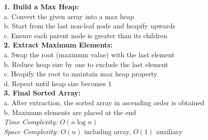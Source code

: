 {\begin{minipage}[t]{1\linewidth}
\begin{minipage}[t]{0.67\textwidth}
          \textbf{1. Build a Max Heap:}\\
          a. Convert the given array into a max heap\\
          b. Start from the last non-leaf node and heapify upwards\\
          c. Ensure each parent node is greater than its children\\
          \textbf{2. Extract Maximum Elements:}\\
          a. Swap the root (maximum value) with the last element\\
          b. Reduce heap size by one to exclude the last element\\
          c. Heapify the root to maintain max heap property\\
          d. Repeat until heap size becomes 1\\
          \textbf{3. Final Sorted Array:}\\
          a. After extraction, the sorted array in ascending order is obtained\\
          b. Maximum elements are placed at the end\\
          \textit{Time Complexity:} \(O(n\log n)\) \\ \textit{Space Complexity:} \(O(n)\) including array, \(O(1)\) auxiliary
      \end{minipage}
      \hfill
      \begin{minipage}[t]{0.32\textwidth}
        \vspace*{-15px}
        \vspace*{-30px}
        \vspace*{-30px}
    \end{minipage}
    \end{minipage}
  }